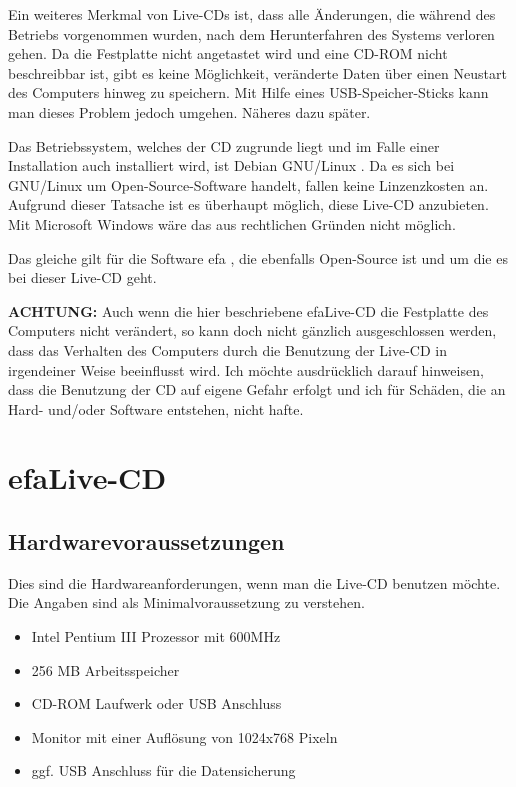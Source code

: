 \documentclass[a4paper,12pt,twoside]{article}
\begin{document}
Ein weiteres Merkmal von Live-CDs ist, dass alle Änderungen, die während
des Betriebs vorgenommen wurden, nach dem Herunterfahren des Systems
verloren gehen. Da die Festplatte nicht angetastet wird und eine CD-ROM
nicht beschreibbar ist, gibt es keine Möglichkeit, veränderte Daten
über einen Neustart des Computers hinweg zu speichern. Mit Hilfe eines
USB-Speicher-Sticks kann man dieses Problem jedoch umgehen. Näheres
dazu später.

Das Betriebssystem, welches der CD zugrunde liegt und im Falle einer
Installation auch installiert wird, ist Debian GNU/Linux \cite{DEB1}.
Da es sich bei GNU/Linux um Open-Source-Software handelt, fallen keine
Linzenzkosten an. Aufgrund dieser Tatsache ist es überhaupt möglich,
diese Live-CD anzubieten. Mit Microsoft Windows wäre das aus
rechtlichen Gründen nicht möglich.

Das gleiche gilt für die Software efa \cite{EFA1}, die ebenfalls
Open-Source ist und um die es bei dieser Live-CD geht.

\bigskip
\textbf{ACHTUNG:} Auch wenn die hier beschriebene efaLive-CD die Festplatte des
Computers nicht verändert, so kann doch nicht gänzlich ausgeschlossen
werden, dass das Verhalten des Computers durch die Benutzung der
Live-CD in irgendeiner Weise beeinflusst wird. Ich möchte ausdrücklich
darauf hinweisen, dass die Benutzung der CD auf eigene Gefahr erfolgt
und ich für Schäden, die an Hard- und/oder Software entstehen, nicht
hafte.
\bigskip

\section{efaLive-CD}
\label{sct:efalivecd}
\subsection{Hardwarevoraussetzungen}
\label{sct:live_hardware}
Dies sind die Hardwareanforderungen, wenn man die Live-CD benutzen
möchte. Die Angaben sind als Minimalvoraussetzung zu verstehen.

\begin{itemize}
    \item Intel Pentium III Prozessor mit 600MHz
    \item 256 MB Arbeitsspeicher
    \item CD-ROM Laufwerk oder USB Anschluss
    \item Monitor mit einer Auflösung von 1024x768 Pixeln
    \item ggf. USB Anschluss für die Datensicherung
\end{itemize}
\end{document}
